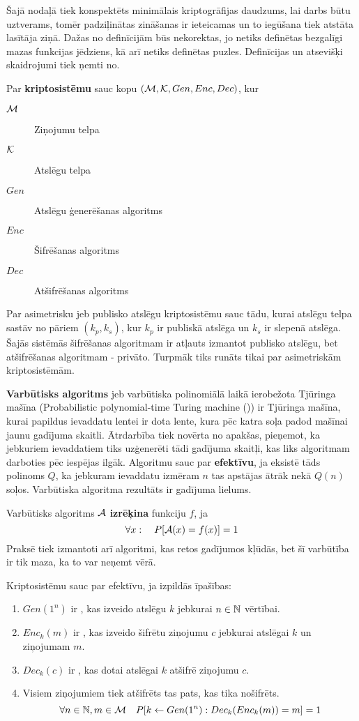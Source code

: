 Šajā nodaļā tiek konspektēts minimālais kriptogrāfijas daudzums, lai darbs būtu uztverams, tomēr padziļinātas zināšanas ir ieteicamas un to iegūšana tiek atstāta lasītāja ziņā. Dažas no definīcijām būs nekorektas, jo netiks definētas bezgalīgi mazas funkcijas jēdziens, kā arī netiks definētas puzles. Definīcijas un atsevišķi skaidrojumi tiek ņemti no\cite{pass10}.

Par \textbf{kriptosistēmu} sauc kopu $(\mathcal{M}, \mathcal{K}, Gen, Enc, Dec)$, kur
\begin{description}
    \item[$\mathcal{M}$]Ziņojumu telpa
    \item[$\mathcal{K}$]Atslēgu telpa
    \item[$Gen$]Atslēgu ģenerēšanas algoritms
    \item[$Enc$]Šifrēšanas algoritms
    \item[$Dec$]Atšifrēšanas algoritms
\end{description}

Par asimetrisku jeb publisko atslēgu kriptosistēmu sauc tādu, kurai atslēgu telpa sastāv no pāriem $(k_p, k_s)$, kur $k_p$ ir publiskā atslēga un $k_s$ ir slepenā atslēga. Šajās sistēmās šifrēšanas algoritmam ir atļauts izmantot publisko atslēgu, bet atšifrēšanas algoritmam - privāto. Turpmāk tiks runāts tikai par asimetriskām kriptosistēmām.

\textbf{Varbūtisks algoritms} jeb varbūtiska polinomiālā laikā ierobežota Tjūringa mašīna (Probabilistic polynomial-time Turing machine (\ppt)) ir Tjūringa mašīna, kurai papildus ievaddatu lentei ir dota lente, kura pēc katra soļa padod mašīnai jaunu gadījuma skaitli. Ātrdarbība tiek novērta no apakšas, pieņemot, ka jebkuriem ievaddatiem tiks uzģenerēti tādi gadījuma skaitļi, kas liks algoritmam darboties pēc iespējas ilgāk. Algoritmu sauc par \textbf{efektīvu}, ja eksistē tāds polinoms $Q$, ka jebkuram ievaddatu izmēram $n$ tas apstājas ātrāk nekā $Q(n)$ soļos. Varbūtiska algoritma rezultāts ir gadījuma lielums.

Varbūtisks algoritms $\mathcal{A}$ \textbf{izrēķina} funkciju $f$, ja
$$ \forall x : \quad P[\mathcal{A}(x) = f(x)] = 1 $$
Praksē tiek izmantoti arī algoritmi, kas retos gadījumos kļūdās, bet šī varbūtība ir tik maza, ka to var neņemt vērā.

Kriptosistēmu sauc par efektīvu, ja izpildās īpašības:
\begin{enumerate}
    \item $Gen(1^n)$ ir \ppt, kas izveido atslēgu $k$ jebkurai $n\in\mathbb{N}$ vērtībai.
    \item $Enc_k(m)$ ir \ppt, kas izveido šifrētu ziņojumu $c$ jebkurai atslēgai $k$ un ziņojumam $m$.
    \item $Dec_k(c)$ ir \ppt, kas dotai atslēgai $k$ atšifrē ziņojumu $c$.
    \item Visiem ziņojumiem tiek atšifrēts tas pats, kas tika nošifrēts.
        $$ \forall n\in\mathbb{N}, m\in\mathcal{M} \quad P[k\leftarrow Gen(1^n): Dec_k(Enc_k(m)) = m] = 1 $$
\end{enumerate}

